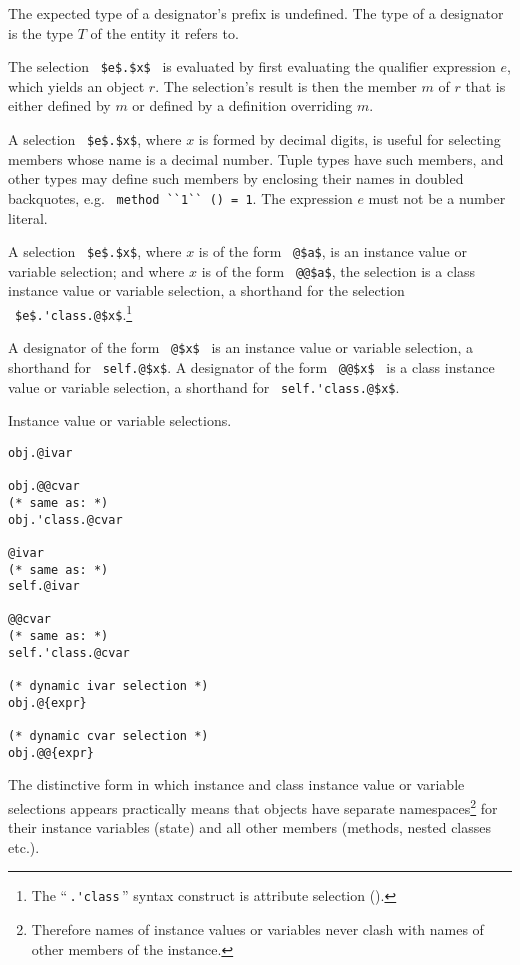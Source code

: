 The expected type of a designator's prefix is undefined. The type of a designator is the type $T$ of the entity it refers to. 

The selection ~\lstinline!$e$.$x$!~ is evaluated by first evaluating the qualifier expression $e$, which yields an object $r$. The selection's result is then the member $m$ of $r$ that is either defined by $m$ or defined by a definition overriding $m$. 

A selection ~\lstinline!$e$.$x$!, where $x$ is formed by decimal digits, is useful for selecting members whose name is a decimal number. Tuple types have such members, and other types may define such members by enclosing their names in doubled backquotes, e.g. ~\lstinline!method ``1`` () = 1!. The expression $e$ must not be a number literal. 

A selection ~\lstinline!$e$.$x$!, where $x$ is of the form ~\lstinline!@$a$!, is an instance value or variable selection; and where $x$ is of the form ~\lstinline!@@$a$!, the selection is a class instance value or variable selection, a shorthand for the selection ~\lstinline[deletekeywords={class}]!$e$.'class.@$x$!.\footnote{The ``\,\lstinline[deletekeywords={class}]!.'class!\,'' syntax construct is attribute selection ().}

A designator of the form ~\lstinline!@$x$!~ is an instance value or variable selection, a shorthand for ~\lstinline!self.@$x$!. A designator of the form ~\lstinline!@@$x$!~ is a class instance value or variable selection, a shorthand for ~\lstinline[deletekeywords={class}]!self.'class.@$x$!. 

\example Instance value or variable selections. 
\begin{lstlisting}[deletekeywords={class}]
obj.@ivar

obj.@@cvar 
(* same as: *)
obj.'class.@cvar

@ivar
(* same as: *)
self.@ivar

@@cvar
(* same as: *)
self.'class.@cvar

(* dynamic ivar selection *)
obj.@{expr}

(* dynamic cvar selection *)
obj.@@{expr}
\end{lstlisting}

The distinctive form in which instance and class instance value or variable selections appears practically means that objects have separate namespaces\footnote{Therefore names of instance values or variables never clash with names of other members of the instance.} for their instance variables (state) and all other members (methods, nested classes etc.). 





